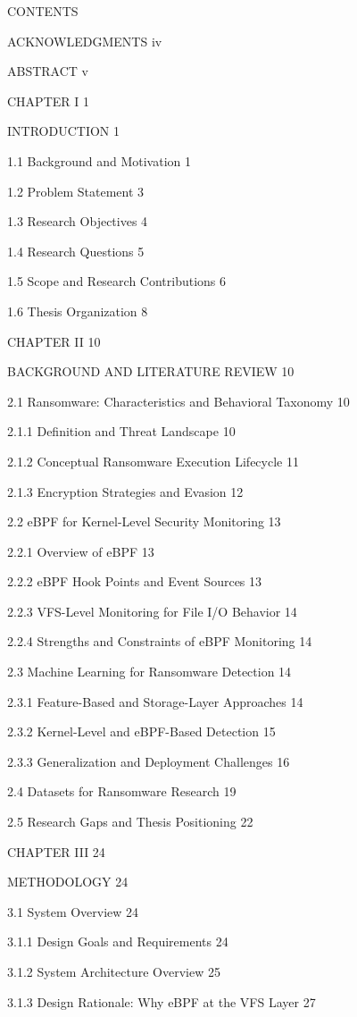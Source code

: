 CONTENTS

ACKNOWLEDGMENTS	iv

ABSTRACT	v

CHAPTER I	1

INTRODUCTION	1

1.1 Background and Motivation	1

1.2  Problem Statement	3

1.3  Research Objectives	4

1.4  Research Questions	5

1.5  Scope and Research Contributions	6

1.6  Thesis Organization	8

CHAPTER II	10

BACKGROUND AND LITERATURE REVIEW	10

2.1  Ransomware: Characteristics and Behavioral Taxonomy	10

2.1.1  Definition and Threat Landscape	10

2.1.2  Conceptual Ransomware Execution Lifecycle	11

2.1.3  Encryption Strategies and Evasion	12

2.2  eBPF for Kernel-Level Security Monitoring	13

2.2.1  Overview of eBPF	13

2.2.2  eBPF Hook Points and Event Sources	13

2.2.3 VFS-Level Monitoring for File I/\allowbreak{}O Behavior	14

2.2.4 Strengths and Constraints of eBPF Monitoring	14

2.3  Machine Learning for Ransomware Detection	14

2.3.1  Feature-Based and Storage-Layer Approaches	14

2.3.2  Kernel-Level and eBPF-Based Detection	15

2.3.3  Generalization and Deployment Challenges	16

2.4  Datasets for Ransomware Research	19

2.5  Research Gaps and Thesis Positioning	22

CHAPTER III	24

METHODOLOGY	24

3.1  System Overview	24

3.1.1  Design Goals and Requirements	24

3.1.2  System Architecture Overview	25

3.1.3  Design Rationale: Why eBPF at the VFS Layer	27

